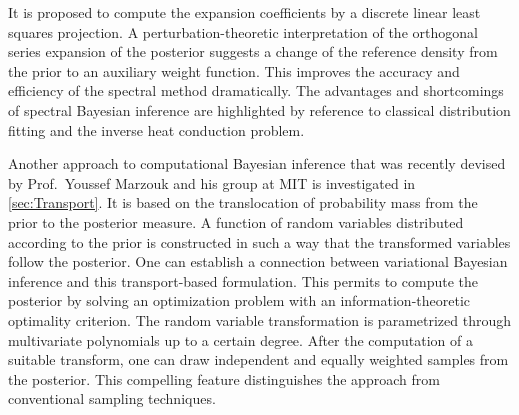 \begin{refsection}
It is proposed to compute the expansion coefficients by a discrete linear least squares projection.
A perturbation-theoretic interpretation of the orthogonal series expansion of the posterior suggests a change of the reference density from the prior to an auxiliary weight function.
This improves the accuracy and efficiency of the spectral method dramatically.
The advantages and shortcomings of spectral Bayesian inference are highlighted by reference to classical distribution fitting and the inverse heat conduction problem.
\par %
Another approach to computational Bayesian inference that was recently devised by Prof.\ Youssef Marzouk and his group at MIT is investigated in \cref{sec:Transport}.
It is based on the translocation of probability mass from the prior to the posterior measure.
A function of random variables distributed according to the prior is constructed in such a way that the transformed variables follow the posterior.
One can establish a connection between variational Bayesian inference and this transport-based formulation.
This permits to compute the posterior by solving an optimization problem with an information-theoretic optimality criterion.
The random variable transformation is parametrized through multivariate polynomials up to a certain degree.
After the computation of a suitable transform, one can draw independent and equally weighted samples from the posterior.
This compelling feature distinguishes the approach from conventional sampling techniques.


\end{refsection}
